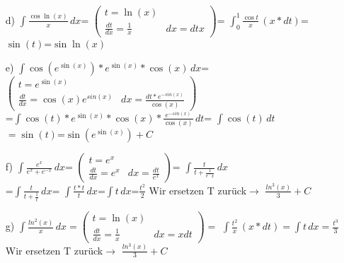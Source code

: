 \documentclass{standalone}
\begin{document}
\begin{itemize}
    \item[d)]
    $\int\frac{\cos{\ln(x)}}{x} \,dx$=
    $\begin{pmatrix}
        t = \ln(x) &  \\
        \frac{dt}{dx} = \frac{1}{x} & dx = dtx
    \end{pmatrix}$= 
    $\int_{0}^{1}\frac{\cos{t}}{x} \,(x*dt)$=
    $\sin(t)$=$\sin\ln(x)$

    \item[e)]
    $\int \cos(e^{\sin(x)})*e^{\sin(x)}*\cos(x)\,dx$=
    $\begin{pmatrix}
        t = e^{\sin(x)} &  \\
        \frac{dt}{dx} = \cos(x)e^{sin(x)} & dx = \frac{dt*e^{-sin(x)}}{\cos(x)}
    \end{pmatrix}$\\
    =$\int \cos(t)*e^{\sin(x)}*\cos(x)*\frac{e^{-sin(x)}}{\cos(x)}\,dt$= 
    $\int \cos(t)\,dt$\\
    $=\sin(t)$=$\sin(e^{\sin(x)})+C$

    \item[f)]
    $\int \frac{e^x}{e^x+e^{-x}}\,dx$=
    $\begin{pmatrix}
        t = e^x &  \\
        \frac{dt}{dx} = e^x & dx = \frac{dt}{e^x}  
    \end{pmatrix}$=
    $\int \frac{t}{t+\frac{1}{e^-x}}\,dx$\\
    =$\int \frac{t}{t+\frac{1}{t}}\,dx$=
    $\int \frac{t*t}{t}\,dx$=$\int t \,dx$=$\frac{t^2}{2}$ Wir ersetzen T zurück$\rightarrow$
    $\frac{ln^3(x)}{3}+C$

    \item[g)]   
    $\int \frac{ln^2(x)}{x}\,dx=
    \begin{pmatrix}
        t = \ln(x) &  \\
        \frac{dt}{dx} = \frac{1}{x} & dx = xdt  
    \end{pmatrix}=$
    $\int \frac{t^2}{x}\,(x*dt)=\int t\,dx=\frac{t^3}{3}$ Wir ersetzen T zurück$\rightarrow$
    $\frac{ln^3(x)}{3}+C$

\end{itemize}
\end{document}
